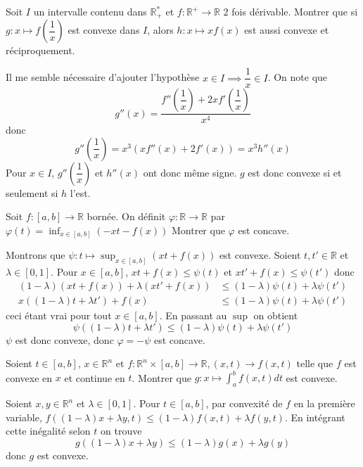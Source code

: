 \documentclass{fancybook}
\begin{document}
\begin{exercice}
Soit $I$ un intervalle contenu dans $\mathbb R^*_+$ et $f:\mathbb R^+\to \mathbb R$ $2$ fois dérivable.\newline
Montrer que si $g:x\mapsto f(\dfrac{1}{x})$ est convexe dans $I$, alors $h:x\mapsto xf(x)$ est aussi convexe et réciproquement.
\end{exercice}
Il me semble nécessaire d'ajouter l'hypothèse $x\in I \implies \dfrac{1}{x}\in I$.\newline \newline
On note que $$g''(x) = \dfrac{f''(\dfrac{1}{x}) + 2xf'(\dfrac{1}{x})}{x^4}$$
donc 
$$g''(\dfrac{1}{x}) = x^3 (xf''(x)+2f'(x)) = x^3 h''(x)$$
Pour $x\in I$, $g''(\dfrac{1}{x})$ et $h''(x)$ ont donc même signe. $g$ est donc convexe si et seulement si $h$ l'est.

\begin{exercice}
Soit $f:[a,b]\to \mathbb R$ bornée.\newline
On définit $\varphi: \mathbb R\to \mathbb R$ par $\varphi(t)=\inf_{x\in [a,b]}(-xt-f(x))$\newline
Montrer que $\varphi$ est concave.
\end{exercice}
Montrons que $\psi:t\mapsto \sup_{x\in [a,b]}(xt + f(x))$ est convexe.\newline
Soient $t,t' \in \mathbb R$ et $\lambda \in [0,1]$. Pour $x\in [a,b]$, $xt+f(x)\leq \psi(t)$ et $xt'+f(x)\leq \psi(t')$ donc $$ \begin{aligned}(1-\lambda)(xt+f(x)) + \lambda(xt'+f(x)) &\leq (1-\lambda) \psi(t) + \lambda \psi(t')\\
x((1-\lambda)t + \lambda t') + f(x)&\leq (1-\lambda) \psi(t) + \lambda \psi(t') \end{aligned}$$
ceci étant vrai pour tout $x\in [a,b]$. En passant au $\sup$ on obtient $$\psi((1-\lambda)t + \lambda t')\leq (1-\lambda) \psi(t) + \lambda \psi(t')$$
$\psi$ est donc convexe, donc $\varphi=-\psi$ est concave.

\begin{exercice}
Soient $t\in [a,b]$, $x\in \mathbb R^n$ et $f:\mathbb R^n\times [a,b] \to \mathbb R, (x,t)\to f(x,t)$ telle que\newline
$f$ est convexe en $x$ et continue en $t$.\newline
Montrer que $g:x\mapsto \int_a^bf(x,t) dt$ est convexe.
\end{exercice}
Soient $x,y\in \mathbb R^n$ et $\lambda \in [0,1]$. Pour $t\in [a,b]$, par convexité de $f$ en la première variable, $f((1-\lambda)x+\lambda y,t)\leq (1-\lambda)f(x,t) + \lambda f(y,t)$.\newline
En intégrant cette inégalité selon $t$ on trouve $$g((1-\lambda)x+\lambda y)\leq (1-\lambda)g(x) + \lambda g(y)$$ donc $g$ est convexe.
\end{document}
